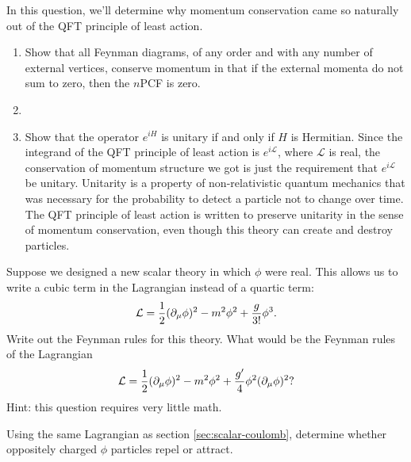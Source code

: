 \begin{problem}
  In this question, we'll determine why momentum conservation came so naturally out of the QFT principle of least action.
  \begin{enumerate}
    \item Show that all Feynman diagrams, of any order and with any number of external vertices, conserve momentum in that if the external momenta do not sum to zero, then the $n$PCF is zero.
    \item {}
    \item Show that the operator $e^{iH}$ is unitary if and only if $H$ is Hermitian. Since the integrand of the QFT principle of least action is $e^{i\mathcal{L}}$, where $\mathcal{L}$ is real, the conservation of momentum structure we got is just the requirement that $e^{i\mathcal{L}}$ be unitary. Unitarity is a property of non-relativistic quantum mechanics that was necessary for the probability to detect a particle not to change over time. The QFT principle of least action is written to preserve unitarity in the sense of momentum conservation, even though this theory can create and destroy particles.
  \end{enumerate}
\end{problem}

\begin{problem}
\end{problem}

\begin{problem}
  Suppose we designed a new scalar theory in which $\phi$ were real. This allows us to write a cubic term in the Lagrangian instead of a quartic term:
  $$\mathcal{L} = \frac{1}{2}(\partial_\mu \phi)^2 - m^2 \phi^2 + \frac{g}{3!}\phi^3.$$
  Write out the Feynman rules for this theory. What would be the Feynman rules of the Lagrangian
  $$\mathcal{L} = \frac{1}{2}(\partial_\mu \phi)^2 - m^2 \phi^2 + \frac{g'}{4}\phi^2(\partial_\mu \phi)^2?$$
  Hint: this question requires very little math.
\end{problem}

\begin{problem}
  Using the same Lagrangian as section \ref{sec:scalar-coulomb}, determine whether oppositely charged $\phi$ particles repel or attract.
\end{problem}

